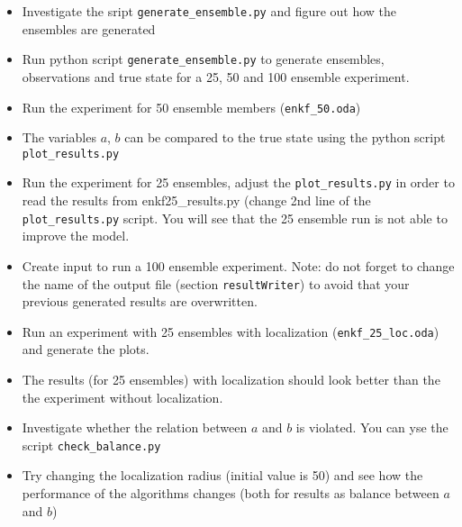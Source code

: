 \begin{itemize}
\item Investigate the sript {\tt generate\_ensemble.py} and figure out how the ensembles are generated
\item Run python script {\tt generate\_ensemble.py} to generate ensembles, observations and true state for a 25, 50 and 100 ensemble experiment.  
\item Run the experiment for 50 ensemble members ({\tt enkf\_50.oda})
\item The variables $a$, $b$ can be compared to the true state using the python script {\tt plot\_results.py}
\item Run the experiment for 25 ensembles, adjust the {\tt plot\_results.py} in order to read the results from enkf25\_results.py 
(change 2nd line of the {\tt plot\_results.py} script. You will see that the 25 ensemble run is not able to improve the model.
\item Create input to run a 100 ensemble experiment. Note: do not forget to change the name of the output file (section {\tt resultWriter}) 
to avoid that your previous generated results are overwritten. 
\item Run an experiment with 25 ensembles with localization ({\tt enkf\_25\_loc.oda}) and generate the plots.
\item The results (for 25 ensembles) with localization should look better than the the experiment without localization.
\item Investigate whether the relation between $a$ and $b$ is violated. You can yse the script {\tt check\_balance.py}
\item Try changing the localization radius (initial value is 50) and see how the performance of the algorithms changes (both for results as balance between $a$ and $b$)
\end{itemize}








